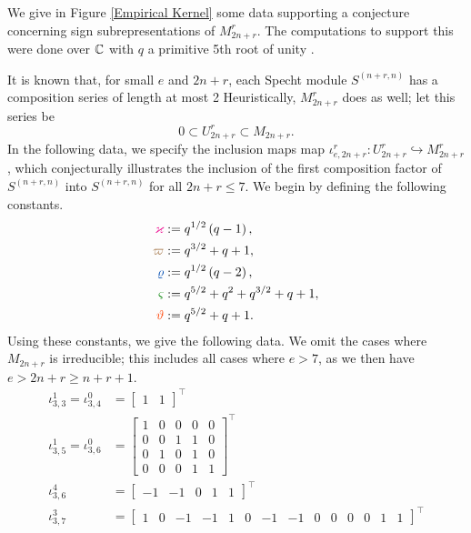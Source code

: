 \documentclass{amsart}
\begin{document}
We give in Figure \ref{Empirical Kernel} some data supporting a conjecture concerning sign subrepresentations of $M_{2n + r}^r$.
The computations to support this were done over $\mathbb{C}$ with $q$ a primitive 5th root of unity \cite{Github}.

It is known that, for small $e$ and $2n + r$, each Specht module $S^{(n+r,n)}$ has a composition series of length at most 2 \cite[Appendix B]{Mathas-book}
Heuristically, $M_{2n + r}^r$ does as well;
let this series be
\[
  0 \subset U_{2n + r}^r \subset M_{2n + r}.
\]
In the following data, we specify the inclusion maps map $\iota_{e,2n+r}^r:U_{2n + r}^r \hookrightarrow M_{2n + r}^r $, which conjecturally illustrates the inclusion of the first composition factor of $S^{(n+r,n)}$ into $S^{(n+r,n)}$ for all $2n + r \leq 7$.
We begin by defining the following constants.
\def\qqo{\color{magenta} \varkappa}
\def\tto{\color{brown!80!black} \varpi}
\def\vtv{\color{blue!70!green} \varrho}
\def\fft{\color{black!50!green}\varsigma}
\def\fto{\color{red!50!orange} \vartheta}
\setcounter{MaxMatrixCols}{20}
\begin{align*}
  \qqo &:= q^{1/2}\prn{q - 1},\\
  \tto &:= q^{3/2} + q + 1,\\
  \vtv &:= q^{1/2}\prn{q - 2},\\
  \fft &:= q^{5/2} + q^2 + q^{3/2} + q + 1,\\ 
  \fto &:= q^{5/2} + q + 1.
\end{align*}
Using these constants, we give the following data.
We omit the cases where $M_{2n + r}$ is irreducible;
this includes all cases where $e > 7$, as we then have $e > 2n + r \geq n + r + 1$.
\begin{align*} 
  \iota_{3,3}^1 = \iota_{3,4}^0 &=  
\begin{bmatrix}
  1 & 1
\end{bmatrix}^\intercal\\
\iota_{3,5}^1 = \iota_{3,6}^0&=  
\begin{bmatrix}
  1 & 0 & 0 & 0 & 0\\
  0 & 0 & 1 & 1 & 0\\
  0 & 1 & 0 & 1 & 0\\
  0 & 0 & 0 & 1 & 1
\end{bmatrix}^\intercal\\
\iota_{3,6}^4&=  
\begin{bmatrix}
  -1 & -1 & 0 & 1 & 1
\end{bmatrix}^\intercal\\
\iota_{3,7}^3&=  
\begin{bmatrix}
 1 & 0 &-1 &-1 & 1 & 0 & -1 & -1 & 0 & 0 & 0 & 0 & 1 & 1
\end{bmatrix}^\intercal
\end{align*}
\end{document}
